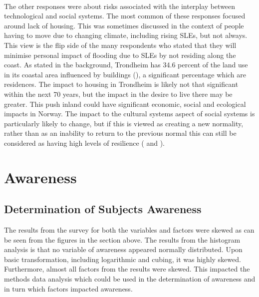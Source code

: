\paragraph{}
The other responses were about risks associated with the interplay between technological and social systems. The most common of these responses focused around lack of housing. This was sometimes discussed in the context of people having to move due to changing climate, including rising SLEs, but not always. This view is the flip side of the many respondents who stated that they will minimise personal impact of flooding due to SLEs by not residing along the coast.  As stated in the background, Trondheim has 34.6 percent of the land use in its coastal area influenced by buildings (\cite{engebakken_construction_2022}), a significant percentage which are residences. The impact to housing in Trondheim is likely not that significant within the next 70 years, but the impact in the desire to live there may be greater. This push inland could have significant economic, social and ecological impacts in Norway. The impact to the cultural systems aspect of social systems is particularly likely to change, but if this is viewed as creating a new normality, rather than as an inability to return to the previous normal this can still be considered as having high levels of resilience (\cite{cutter_place-based_2008} and \cite{cutter_community_2020}).
\paragraph{}




\section{Awareness}

\subsection{Determination of Subjects Awareness}
The results from the survey for both the variables and factors were skewed as can be seen from the figures in the section above. The results from the histogram analysis is that no variable of awareness appeared normally distributed. Upon basic transformation, including logarithmic and cubing, it was highly skewed. Furthermore, almost all factors from the results were skewed. This impacted the methods data analysis which could be used in the determination of awareness and in turn which factors impacted awareness. 

